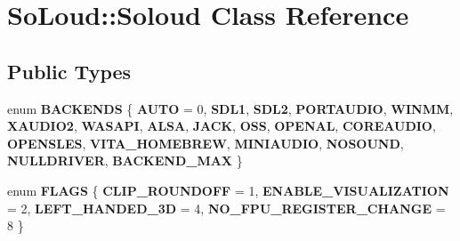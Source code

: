 \hypertarget{class_so_loud_1_1_soloud}{}\section{So\+Loud\+::Soloud Class Reference}
\label{class_so_loud_1_1_soloud}
\subsection*{Public Types}
\begin{DoxyCompactItemize}
\item 
\mbox{\label{class_so_loud_1_1_soloud_ac96d355c9a04c9bccb5540ff93555264}} 
enum {\bfseries B\+A\+C\+K\+E\+N\+DS} \{ \newline
{\bfseries A\+U\+TO} = 0, 
{\bfseries S\+D\+L1}, 
{\bfseries S\+D\+L2}, 
{\bfseries P\+O\+R\+T\+A\+U\+D\+IO}, 
\newline
{\bfseries W\+I\+N\+MM}, 
{\bfseries X\+A\+U\+D\+I\+O2}, 
{\bfseries W\+A\+S\+A\+PI}, 
{\bfseries A\+L\+SA}, 
\newline
{\bfseries J\+A\+CK}, 
{\bfseries O\+SS}, 
{\bfseries O\+P\+E\+N\+AL}, 
{\bfseries C\+O\+R\+E\+A\+U\+D\+IO}, 
\newline
{\bfseries O\+P\+E\+N\+S\+L\+ES}, 
{\bfseries V\+I\+T\+A\+\_\+\+H\+O\+M\+E\+B\+R\+EW}, 
{\bfseries M\+I\+N\+I\+A\+U\+D\+IO}, 
{\bfseries N\+O\+S\+O\+U\+ND}, 
\newline
{\bfseries N\+U\+L\+L\+D\+R\+I\+V\+ER}, 
{\bfseries B\+A\+C\+K\+E\+N\+D\+\_\+\+M\+AX}
 \}
\item 
\mbox{\label{class_so_loud_1_1_soloud_ae53f6fced10211ed39249c59bd24ad6b}} 
enum {\bfseries F\+L\+A\+GS} \{ {\bfseries C\+L\+I\+P\+\_\+\+R\+O\+U\+N\+D\+O\+FF} = 1, 
{\bfseries E\+N\+A\+B\+L\+E\+\_\+\+V\+I\+S\+U\+A\+L\+I\+Z\+A\+T\+I\+ON} = 2, 
{\bfseries L\+E\+F\+T\+\_\+\+H\+A\+N\+D\+E\+D\+\_\+3D} = 4, 
{\bfseries N\+O\+\_\+\+F\+P\+U\+\_\+\+R\+E\+G\+I\+S\+T\+E\+R\+\_\+\+C\+H\+A\+N\+GE} = 8
 \}
\end{DoxyCompactItemize}
